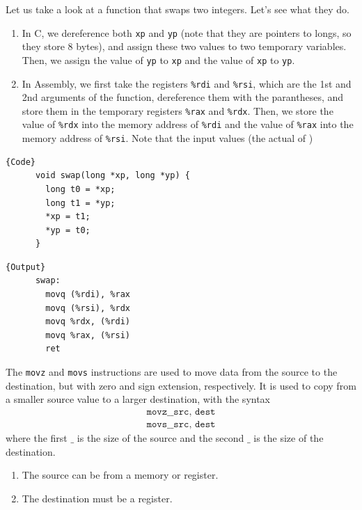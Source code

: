 \documentclass{article}
\begin{document}
  \begin{example}
    Let us take a look at a function that swaps two integers. Let's see what they do. 
    \begin{enumerate}
      \item In C, we dereference both \texttt{xp} and \texttt{yp} (note that they are pointers to longs, so they store 8 bytes), and assign these two values to two temporary variables. Then, we assign the value of \texttt{yp} to \texttt{xp} and the value of \texttt{xp} to \texttt{yp}.
      \item In Assembly, we first take the registers \texttt{\%rdi} and \texttt{\%rsi}, which are the 1st and 2nd arguments of the function, dereference them with the parantheses, and store them in the temporary registers \texttt{\%rax} and \texttt{\%rdx}. Then, we store the value of \texttt{\%rdx} into the memory address of \texttt{\%rdi} and the value of \texttt{\%rax} into the memory address of \texttt{\%rsi}. Note that the input values (the actual of )
    \end{enumerate}

    \noindent\begin{minipage}{.5\textwidth}
    \begin{lstlisting}[]{Code}
      void swap(long *xp, long *yp) {
        long t0 = *xp;
        long t1 = *yp;
        *xp = t1;
        *yp = t0;
      }
    \end{lstlisting}
    \end{minipage}
    \hfill
    \begin{minipage}{.49\textwidth}
    \begin{lstlisting}[]{Output}
      swap:
        movq (%rdi), %rax
        movq (%rsi), %rdx
        movq %rdx, (%rdi)
        movq %rax, (%rsi)
        ret
    \end{lstlisting}
    \end{minipage}
  \end{example}

  \begin{definition}
    The \texttt{movz} and \texttt{movs} instructions are used to move data from the source to the destination, but with zero and sign extension, respectively. It is used to copy from a smaller source value to a larger destination, with the syntax 
    \begin{align*}
      \texttt{movz\_\_ src, dest} \\ 
      \texttt{movs\_\_ src, dest} 
    \end{align*}
    where the first $\_$ is the size of the source and the second $\_$ is the size of the destination. 
    \begin{enumerate}
      \item The source can be from a memory or register. 
      \item The destination must be a register. 
    \end{enumerate}
  \end{definition}
\end{document}
